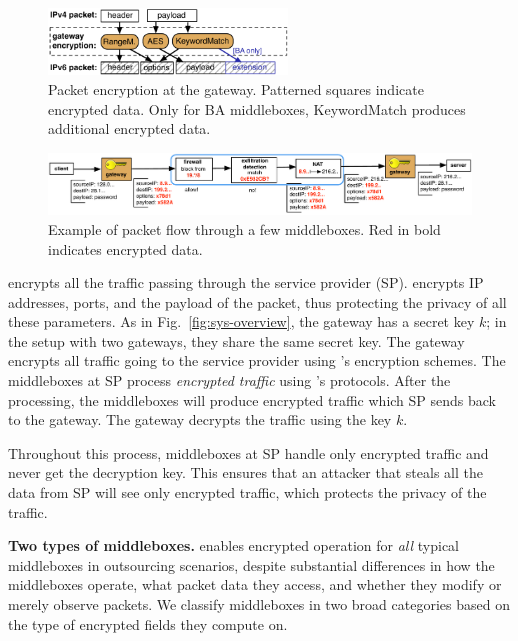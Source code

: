 \begin{figure}[t!]
\centering
  \includegraphics[width=2.5in]{fig/packet.pdf}
\caption{Packet encryption at the gateway. Patterned squares indicate encrypted data. Only for BA  middleboxes,  KeywordMatch produces additional encrypted data.  \label{fig:packet}}
\end{figure}





\begin{figure}[t!]
\centering
  \includegraphics[width=5.5in]{fig/packetpath.pdf}
\caption{Example of packet flow through a few middleboxes. Red in bold indicates encrypted data. \label{fig:packetflow}}
\end{figure}


 \sys encrypts all the traffic passing through the service provider (SP).
\sys encrypts IP addresses, ports, and the payload of the packet, thus protecting the privacy of all these parameters. 
As in Fig.~\ref{fig:sys-overview}, the gateway has a secret key $k$; in the setup with two gateways, they share
the same secret key. The gateway encrypts all traffic going to the service provider using \sys's encryption schemes.
The middleboxes at SP process {\em encrypted traffic} using \sys's protocols. 
After the processing, the middleboxes
will produce encrypted traffic which SP sends back to the gateway. The gateway decrypts the traffic using the key $k$.

Throughout this process, middleboxes at SP handle only encrypted traffic and never get the decryption key. This ensures
that an attacker that steals all the data from SP will  see only encrypted traffic, which protects the privacy of the 
traffic. 

\eat
\noindent\textbf{Two types of middleboxes.} \sys enables encrypted operation for {\em all} typical middleboxes in outsourcing scenarios, despite substantial differences in how the middleboxes operate, what packet data they access, and whether they modify or merely observe packets.
  We classify middleboxes in  two broad categories based on the type of encrypted fields  they compute on.

